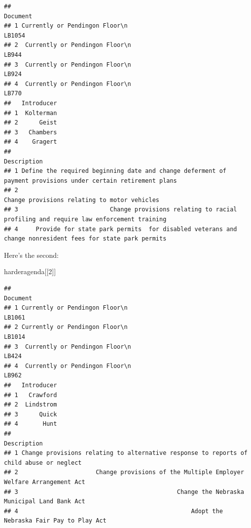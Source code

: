 \documentclass[]{book}
\newenvironment{Shaded}{\begin{snugshade}}{\end{snugshade}}
\newcommand{\DecValTok}[1]{\textcolor[rgb]{0.00,0.00,0.81}{#1}}
\newcommand{\NormalTok}[1]{#1}
\begin{document}
\begin{verbatim}
##                                                                                               Document
## 1 Currently or Pendingon Floor\n                                                                LB1054
## 2  Currently or Pendingon Floor\n                                                                LB944
## 3  Currently or Pendingon Floor\n                                                                LB924
## 4  Currently or Pendingon Floor\n                                                                LB770
##   Introducer
## 1  Kolterman
## 2      Geist
## 3   Chambers
## 4    Gragert
##                                                                                                    Description
## 1 Define the required beginning date and change deferment of payment provisions under certain retirement plans
## 2                                                                 Change provisions relating to motor vehicles
## 3                          Change provisions relating to racial profiling and require law enforcement training
## 4     Provide for state park permits  for disabled veterans and change nonresident fees for state park permits
\end{verbatim}

Here's the second:

\begin{Shaded}
\begin{Highlighting}[]
\NormalTok{harderagenda[[}\DecValTok{2}\NormalTok{]]}
\end{Highlighting}
\end{Shaded}

\begin{verbatim}
##                                                                                               Document
## 1 Currently or Pendingon Floor\n                                                                LB1061
## 2 Currently or Pendingon Floor\n                                                                LB1014
## 3  Currently or Pendingon Floor\n                                                                LB424
## 4  Currently or Pendingon Floor\n                                                                LB962
##   Introducer
## 1   Crawford
## 2  Lindstrom
## 3      Quick
## 4       Hunt
##                                                                               Description
## 1 Change provisions relating to alternative response to reports of child abuse or neglect
## 2                      Change provisions of the Multiple Employer Welfare Arrangement Act
## 3                                             Change the Nebraska Municipal Land Bank Act
## 4                                                 Adopt the Nebraska Fair Pay to Play Act
\end{verbatim}
\end{document}
